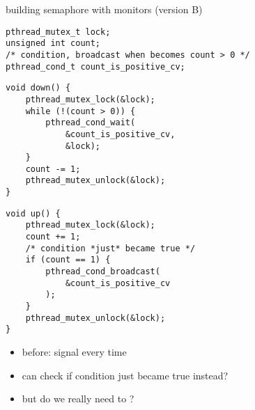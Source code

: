 \usetikzlibrary{arrows.meta,matrix}

\begin{frame}[fragile,label=semaphoreWithMonitorsBCast]{building semaphore with monitors (version B)}
\begin{lstlisting}
pthread_mutex_t lock;
unsigned int count;
/* condition, broadcast when becomes count > 0 */
pthread_cond_t count_is_positive_cv;
\end{lstlisting}

\begin{minipage}{0.45\textwidth}
\begin{lstlisting}
void down() {
    pthread_mutex_lock(&lock);
    while (!(count > 0)) {
        pthread_cond_wait(
            &count_is_positive_cv,
            &lock);
    }
    count -= 1;
    pthread_mutex_unlock(&lock);
}
\end{lstlisting}
\end{minipage}
\begin{minipage}{0.45\textwidth}
\begin{lstlisting}
void up() {
    pthread_mutex_lock(&lock);
    count += 1;
    /* condition *just* became true */
    if (count == 1) {
        pthread_cond_broadcast(
            &count_is_positive_cv
        );
    }
    pthread_mutex_unlock(&lock);
}
\end{lstlisting}
\end{minipage}
\begin{itemize}
\item before: signal every time
\item can check if condition just became true instead?
\item<2-> but do we really need to ?
\end{itemize}
\end{frame}

